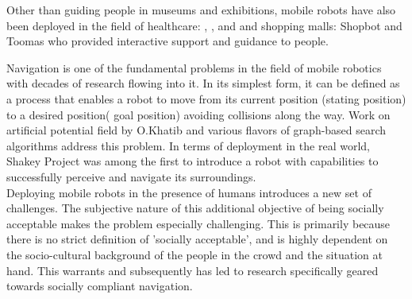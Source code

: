 Other than guiding people in museums and exhibitions, mobile robots have also been deployed in the field of healthcare: \cite{pearl_pollack_2002}, \cite{kim_socially_2016}, and \cite{kuderer_feature-based_nodate} and shopping malls: Shopbot \cite{shopbot_kanada} and Toomas \cite{toomas_gross_2009} who provided interactive support and guidance to people.   



Navigation is one of the fundamental problems in the field of mobile robotics with decades of research flowing into it. In its simplest form, it can be defined as a process that enables a robot to move from its current position (stating position) to a desired position( goal position) avoiding collisions along the way. Work on artificial potential field by O.Khatib \cite{khatib_1986} and various flavors of graph-based search algorithms address this problem. In terms of deployment in the real world, Shakey Project \cite{project-shakey} was among the first to introduce a robot with capabilities to successfully perceive and navigate its surroundings.\\

Deploying mobile robots in the presence of humans introduces a new set of challenges.  The subjective nature of this additional objective of being socially acceptable makes the problem especially challenging. This is primarily because there is no strict definition of 'socially acceptable', and is highly dependent on the socio-cultural background of the people in the crowd and the situation at hand. This warrants and subsequently has led to research specifically geared towards socially compliant navigation.\\

